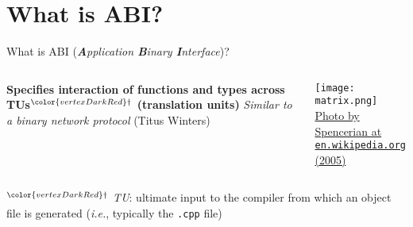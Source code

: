 \section{What is ABI?}

\begin{frame}
    \centering
    \scalebox{3}{What is ABI?}
\end{frame}

\begin{frame}{What is ABI (\textit{\textbf{A}pplication \textbf{B}inary \textbf{I}nterface})?}
    \begin{columns}
        \begin{column}{.6\textwidth}
            \textbf{Specifies interaction of functions and types across TUs${}^{\color{vertexDarkRed}\dagger}$ (translation units)}
            \textit{Similar to a binary network protocol} (Titus Winters)
        \end{column}
        \begin{column}{.3\textwidth}
            \centering
            \texttt{[image: matrix.png]}\\
            {\footnotesize \href{https://commons.wikimedia.org/wiki/File:Spencerian_Matrix_cosplay.jpg}{Photo by Spencerian at \texttt{en.wikipedia.org} (2005)}}
        \end{column}
    \end{columns}

    \vspace{5mm}

    \footnotesize ${}^{\color{vertexDarkRed}\dagger}$ \textit{TU}: ultimate input to the compiler from which an object file is generated (\textit{i.e.}, typically the \texttt{.cpp} file)
\end{frame}

